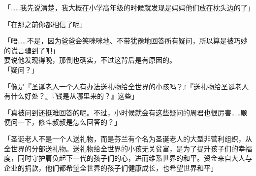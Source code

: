 「……我先说清楚，我大概在小学高年级的时候就发现是妈妈他们放在枕头边的了」

「在那之前你都相信了呢」

「唔……不是，因为爸爸会笑咪咪地、不带犹豫地回答所有疑问，所以算是被巧妙的谎言骗到了吧」\\

要说他发现得晚，那倒也确实，不过这背后是有原因的。\\

「疑问？」

「像是『圣诞老人一个人有办法送礼物给全世界的小孩吗？』『送礼物给圣诞老人有什么好处？』『钱是从哪里来的？』这些」

「真被问到还挺难回答的呢。不过，小时候就会有这些疑问的周君也很厉害……顺便问一下，修斗叔叔是怎么回答的？」

「圣诞老人不是一个人送礼物，而是芬兰有个名为圣诞老人的大型非营利组织，从全世界的分部送礼物。送礼物给全世界的小孩无关贫富，是为了提升孩子们的幸福度，同时守护肩负起下一代的孩子们的心，进而维系世界的和平。资金来自大人与企业的捐款，他们都希望全世界的孩子们健康成长，也希望世界和平」

